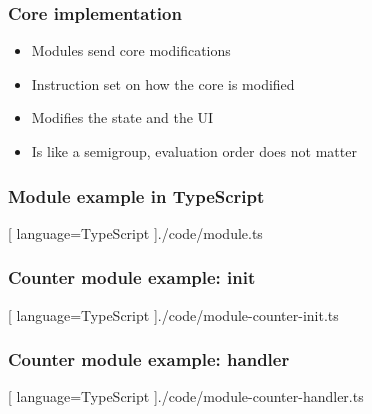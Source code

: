 \begin{frame}
  \frametitle{Core implementation}
  \begin{itemize}
    \pause
    \item Modules send core modifications
    \pause
    \item Instruction set on how the core is modified
    \pause
    \item Modifies the state and the UI
    \pause
    \item Is like a semigroup, evaluation order does not matter
  \end{itemize}
\end{frame}

\begin{frame}
  \frametitle{Module example in TypeScript}
  \begin{center}
    
    [ language=TypeScript
    ]{./code/module.ts}
  \end{center}
\end{frame}

\begin{frame}
  \frametitle{Counter module example: init}
  \begin{center}
    
    [ language=TypeScript
    ]{./code/module-counter-init.ts}
  \end{center}
\end{frame}

\begin{frame}
  \frametitle{Counter module example: handler}
  \begin{center}
    
    [ language=TypeScript
    ]{./code/module-counter-handler.ts}
  \end{center}
\end{frame}
